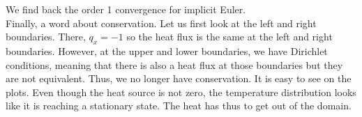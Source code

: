 We find back the order 1 convergence for implicit Euler.\\

Finally, a word about conservation. Let us first look at the left and right boundaries. There,  $q_x=-1$ so the heat flux is the same at the left and right boundaries. However, at the upper and lower boundaries, we have Dirichlet conditions, meaning that there is also a heat flux at those boundaries but they are not equivalent. Thus, we no longer have conservation. It is easy to see on the plots. Even though the heat source is not zero, the temperature distribution looks like it is reaching a stationary state. The heat has thus to get out of the domain.